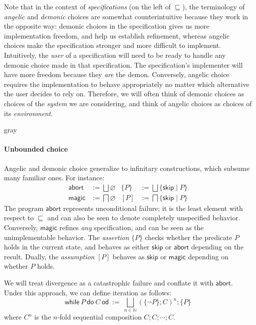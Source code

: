\documentclass[sigplan,10pt,review,anonymous]{acmart}
\newcommand{\kw}[1]{\ensuremath{ \mathsf{#1} }}
\begin{document}
Note that in the context of \emph{specifications}
(on the left of $\sqsubseteq$),
the terminology of \emph{angelic} and \emph{demonic}
choices are somewhat counterintuitive
because they work in the opposite way:
demonic choices in the specification gives us more
implementation freedom,
and help us establish refinement,
whereas angelic choices make the specification
stronger and more difficult to implement.
Intuitively,
the \emph{user} of a specification
will need to be ready to handle any demonic choice
made in that specification.
The specification's implementer
will have more freedom because they \emph{are} the demon.
Conversely,
angelic choice requires the implementation
to behave appropriately
no matter which alternative the user decides to rely on.
Therefore,
we will often think of demonic choices as
choices of the \emph{system} we are considering,
and think of angelic choices as
choices of its \emph{environment}.


\begin{color}{gray}
\paragraph{Unbounded choice} %

Angelic and demonic choice
generalize to infinitary constructions,
which subsume many familiar ones.
For instance:
\begin{align*}
  \kw{abort} &:= \bigsqcup \varnothing &
  \{ P \} &:= \bigsqcup \{ \kw{skip} \mid P \} \\
  \kw{magic} &:= \bigsqcap \varnothing &
  [ P ] &:= \bigsqcap \{ \kw{skip} \mid P \}
\end{align*}
The program $\kw{abort}$ represents unconditional failure;
it is the least element with respect to $\sqsubseteq$
and can also be seen to denote completely unspecified behavior.
Conversely, $\kw{magic}$ refines \emph{any} specification,
and can be seen as the unimplementable behavior.
The \emph{assertion} $\{P\}$ checks whether
the predicate $P$ holds in the current state,
and behaves as either $\kw{skip}$ or $\kw{abort}$
depending on the result.
Dually, the \emph{assumption} $[P]$ behaves as
$\kw{skip}$ or $\kw{magic}$ depending on whether $P$ holds.

We will treat divergence as a catastrophic failure
and conflate it with \kw{abort}.
Under this approach,
we can define iteration as follows:
\[
  \kw{while} \: P \: \kw{do} \: C \: \kw{od} \: := \:
    \bigsqcup_{n \in \mathbb{N}}
    (\{\neg P\}; C)^n ; \{P\}
\]
where $C^n$ is the $n$-fold sequential composition
$C ; C ; \cdots ; C$.


\end{color}
\end{document}
